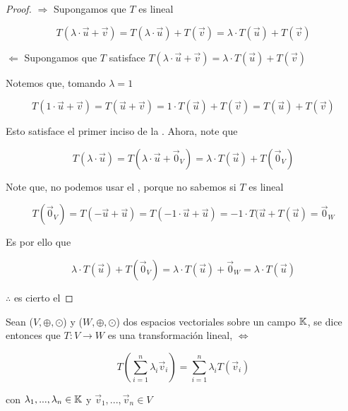 \begin{proof}
    $\Rightarrow$ Supongamos que $T$ es lineal

    $$T(\lambda \cdot \vec{u} + \vec{v}) = T(\lambda \cdot \vec{u}) + T(\vec{v}) =  \lambda \cdot T(\vec{u}) + T(\vec{v})$$

    $\Leftarrow$ Supongamos que $T$ satisface $T(\lambda \cdot \vec{u} + \vec{v}) = \lambda \cdot T(\vec{u}) + T(\vec{v})$

    Notemos que, tomando $\lambda = 1$

    $$ T(1 \cdot \vec{u} + \vec{v}) = T(\vec{u} + \vec{v}) = 1 \cdot T(\vec{u}) + T(\vec{v}) = T(\vec{u}) + T(\vec{v})$$

    Esto satisface el primer inciso de la . Ahora, note que

    $$T(\lambda \cdot \vec{u}) = T(\lambda \cdot \vec{u}+ \vec{0}_V) = \lambda \cdot T(\vec{u}) + T(\vec{0}_V)$$

    Note que, no podemos usar el , porque no sabemos si $T$ es lineal

    $$T(\vec{0}_V) = T(-\vec{u}+\vec{u}) = T(-1 \cdot \vec{u} + \vec{u}) = -1 \cdot T(\vec{u} + T(\vec{u}) = \vec{0}_W$$

    Es por ello que 

    $$\lambda \cdot T(\vec{u}) + T(\vec{0}_V) = \lambda \cdot T(\vec{u}) + \vec{0}_W = \lambda \cdot T(\vec{u}) $$

    $\therefore$ es cierto el 
\end{proof}

\begin{theorem} \label{theom213}
     Sean ($V, \oplus, \odot$) y ($W, \oplus, \odot$) dos espacios vectoriales sobre un campo $\mathbb{K}$, se dice entonces que $T : V \to W$ es una transformación lineal, $\Leftrightarrow$

    $$T \left( \sum_{i=1}^{n} \lambda_i {\vec{v}}_{i} \right) =  \sum_{i=1}^{n}\lambda_i  T\left( {\vec{v}}_{i} \right)$$

    con $\lambda_1, ..., \lambda_n \in \mathbb{K}$ y ${\vec{v}}_{1}, ..., {\vec{v}}_{n} \in V$
\end{theorem}

